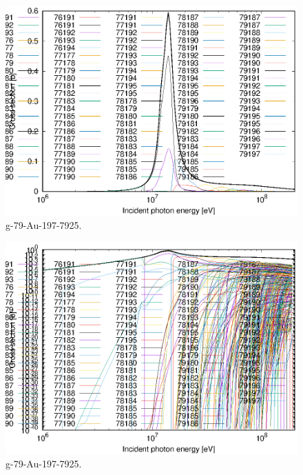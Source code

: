 \begin{figure}
 \includegraphics[width=\linewidth]{eps/g_79-Au-197_7925.eps}
  \caption{g-79-Au-197-7925.}
\end{figure}
\begin{figure}
 \includegraphics[width=\linewidth]{eps-log/g_79-Au-197_7925.eps}
 \caption{g-79-Au-197-7925.}
\end{figure}
\newpage \clearpage

